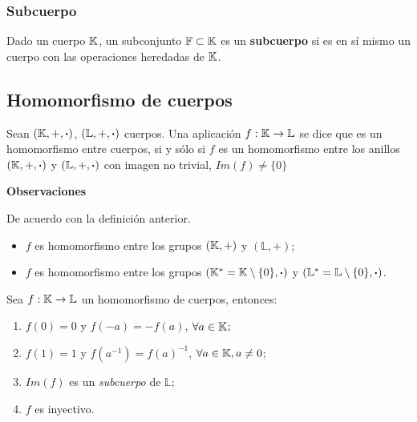 \subsubsection{Subcuerpo}
\vspace{1em}
\begin{fmd-definition}[Subcuerpo]
	Dado un cuerpo $\mathbb{K}$, un subconjunto $\mathbb{F} \subset \mathbb{K}$ es un \textbf{subcuerpo} si es en sí mismo un cuerpo con las operaciones heredadas de $\mathbb{K}$.
\end{fmd-definition}

\subsection{Homomorfismo de cuerpos}
\vspace{1em}
\begin{fmd-definition}
	Sean $(\mathbb{K}, +, \boldsymbol{\cdot})$, $(\mathbb{L}, +, \boldsymbol{\cdot})$ cuerpos. Una aplicación $f: \mathbb{K} \rightarrow \mathbb{L}$ se dice que es un homomorfismo entre cuerpos, si y sólo si $f$ es un homomorfismo entre los anillos $(\mathbb{K}, +, \boldsymbol{\cdot})$ y $(\mathbb{L}, +, \boldsymbol{\cdot})$ con imagen no trivial, $Im(f) \ne \{ 0 \}$
\end{fmd-definition}

\textbf{Observaciones}

De acuerdo con la definición anterior.
\begin{itemize}
	\item $f$ es homomorfismo entre los grupos $(\mathbb{K}, +)$ y $(\mathbb{L}, +)$;
	\item $f$ es homomorfismo entre los grupos $(\mathbb{K}^* =  \mathbb{K} \setminus \{0\}, \boldsymbol{\cdot})$ y $(\mathbb{L}^* = \mathbb{L} \setminus \{0\}, \boldsymbol{\cdot})$.
\end{itemize}

\begin{fmd-theorem}
	Sea $f: \mathbb{K} \rightarrow \mathbb{L}$ un homomorfismo de cuerpos, entonces:
	\begin{enumerate}[label=\alph*)]
		\item $f(0) = 0$ y $f(-a) = -f(a)$, $\forall a \in \mathbb{K}$;
		\item $f(1) = 1$ y $f(a^{-1}) = f(a)^{-1}$, $\forall a \in \mathbb{K}, a \ne 0$;
		\item $Im(f)$ es un \textit{subcuerpo} de $\mathbb{L}$;
		\item $f$ es inyectivo.
 	\end{enumerate}
\end{fmd-theorem}

